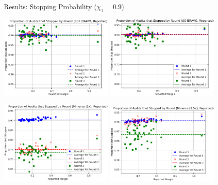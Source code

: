 \documentclass[aspectratio=169]{beamer}
\begin{document}
\thispagestyle{empty}
\begin{frame}
\hspace{-1cm}
\begin{turn}{-90}
 Results: Stopping Probability ($\chi_1=0.9$)
\end{turn}


\pause
\vspace{-.8\textheight}
\includegraphics[width=0.425\textwidth]{scale/eor.png}
\pause 
\includegraphics[width=0.425\textwidth]{scale/so.png}
\pause 

\includegraphics[width=0.425\textwidth]{scale/minerva1.png}
\pause 
\includegraphics[width=0.425\textwidth]{scale/minerva1p5.png}
\end{frame}
\end{document}
